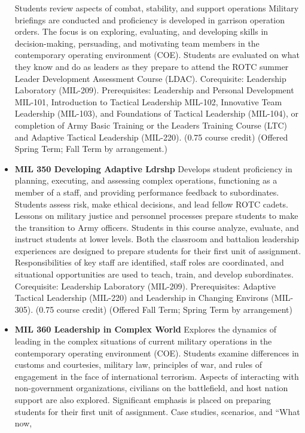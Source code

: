 \documentclass[
  letterpaper,
]{scrbook}
\begin{document}
\begin{itemize}
  Students review aspects of combat, stability, and support operations
  Military briefings are conducted and proficiency is developed in
  garrison operation orders. The focus is on exploring, evaluating, and
  developing skills in decision-making, persuading, and motivating team
  members in the contemporary operating environment (COE). Students are
  evaluated on what they know and do as leaders as they prepare to
  attend the ROTC summer Leader Development Assessment Course (LDAC).
  Corequisite: Leadership Laboratory (MIL-209). Prerequisites:
  Leadership and Personal Development MIL-101, Introduction to Tactical
  Leadership MIL-102, Innovative Team Leadership (MIL-103), and
  Foundations of Tactical Leadership (MIL-104), or completion of Army
  Basic Training or the Leaders Training Course (LTC) and Adaptive
  Tactical Leadership (MIL-220). (0.75 course credit) (Offered Spring
  Term; Fall Term by arrangement.)
\item
  \textbf{MIL 350 Developing Adaptive Ldrshp} Develops student
  proficiency in planning, executing, and assessing complex operations,
  functioning as a member of a staff, and providing performance feedback
  to subordinates. Students assess risk, make ethical decisions, and
  lead fellow ROTC cadets. Lessons on military justice and personnel
  processes prepare students to make the transition to Army officers.
  Students in this course analyze, evaluate, and instruct students at
  lower levels. Both the classroom and battalion leadership experiences
  are designed to prepare students for their first unit of assignment.
  Responsibilities of key staff are identified, staff roles are
  coordinated, and situational opportunities are used to teach, train,
  and develop subordinates. Corequisite: Leadership Laboratory
  (MIL-209). Prerequisites: Adaptive Tactical Leadership (MIL-220) and
  Leadership in Changing Environs (MIL-305). (0.75 course credit)
  (Offered Fall Term; Spring Term by arrangement)
\item
  \textbf{MIL 360 Leadership in Complex World} Explores the dynamics of
  leading in the complex situations of current military operations in
  the contemporary operating environment (COE). Students examine
  differences in customs and courtesies, military law, principles of
  war, and rules of engagement in the face of international terrorism.
  Aspects of interacting with non-government organizations, civilians on
  the battlefield, and host nation support are also explored.
  Significant emphasis is placed on preparing students for their first
  unit of assignment. Case studies, scenarios, and ``What now,

\end{itemize}
\end{document}
